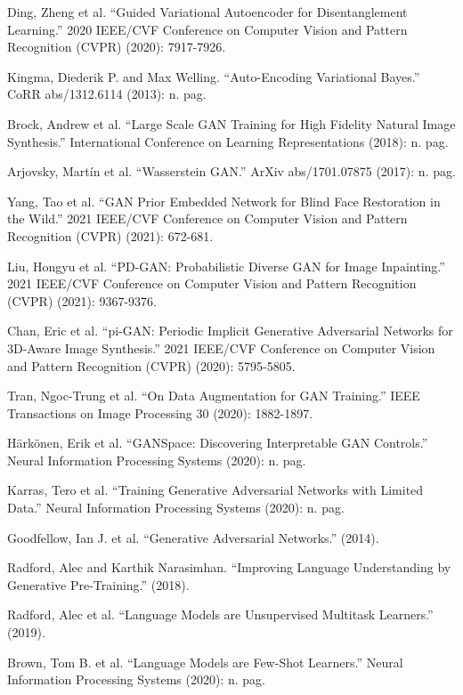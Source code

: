 \documentclass[preprint,12pt,authoryear]{elsarticle}
\begin{document}
\begin{thebibliography}{00}
Ding, Zheng et al. “Guided Variational Autoencoder for Disentanglement Learning.” 2020 IEEE/CVF Conference on Computer Vision and Pattern Recognition (CVPR) (2020): 7917-7926.

Kingma, Diederik P. and Max Welling. “Auto-Encoding Variational Bayes.” CoRR abs/1312.6114 (2013): n. pag.

Brock, Andrew et al. “Large Scale GAN Training for High Fidelity Natural Image Synthesis.” International Conference on Learning Representations (2018): n. pag.

Arjovsky, Martín et al. “Wasserstein GAN.” ArXiv abs/1701.07875 (2017): n. pag.

Yang, Tao et al. “GAN Prior Embedded Network for Blind Face Restoration in the Wild.” 2021 IEEE/CVF Conference on Computer Vision and Pattern Recognition (CVPR) (2021): 672-681.

Liu, Hongyu et al. “PD-GAN: Probabilistic Diverse GAN for Image Inpainting.” 2021 IEEE/CVF Conference on Computer Vision and Pattern Recognition (CVPR) (2021): 9367-9376.

Chan, Eric et al. “pi-GAN: Periodic Implicit Generative Adversarial Networks for 3D-Aware Image Synthesis.” 2021 IEEE/CVF Conference on Computer Vision and Pattern Recognition (CVPR) (2020): 5795-5805.

Tran, Ngoc-Trung et al. “On Data Augmentation for GAN Training.” IEEE Transactions on Image Processing 30 (2020): 1882-1897.

Härkönen, Erik et al. “GANSpace: Discovering Interpretable GAN Controls.” Neural Information Processing Systems (2020): n. pag.

Karras, Tero et al. “Training Generative Adversarial Networks with Limited Data.”  Neural Information Processing Systems (2020): n. pag.

Goodfellow, Ian J. et al. “Generative Adversarial Networks.” (2014).

Radford, Alec and Karthik Narasimhan. “Improving Language Understanding by Generative Pre-Training.” (2018).

Radford, Alec et al. “Language Models are Unsupervised Multitask Learners.” (2019).

Brown, Tom B. et al. “Language Models are Few-Shot Learners.” Neural Information Processing Systems (2020): n. pag.


\end{thebibliography}
\end{document}
